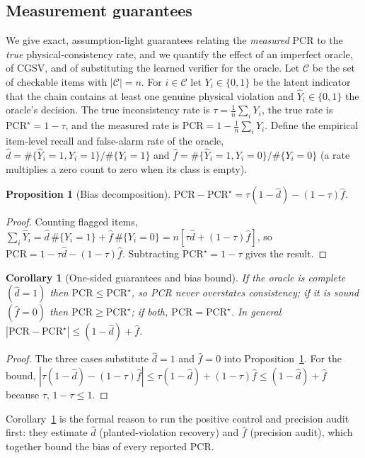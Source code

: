 \documentclass[pdflatex,sn-nature]{sn-jnl}
\newtheorem{proposition}{Proposition}
\newtheorem{corollary}{Corollary}
\begin{document}
\subsection*{Measurement guarantees}
We give exact, assumption-light guarantees relating the \emph{measured} PCR to the
\emph{true} physical-consistency rate, and we quantify the effect of an imperfect
oracle, of CGSV, and of substituting the learned verifier for the oracle. Let
$\mathcal{C}$ be the set of checkable items with $|\mathcal{C}|=n$. For
$i\in\mathcal{C}$ let $Y_i\in\{0,1\}$ be the latent indicator that the chain contains
at least one genuine physical violation and $\hat Y_i\in\{0,1\}$ the oracle's decision.
The true inconsistency rate is $\tau=\frac1n\sum_i Y_i$, the true rate is
$\mathrm{PCR}^\star=1-\tau$, and the measured rate is
$\mathrm{PCR}=1-\frac1n\sum_i\hat Y_i$. Define the empirical item-level recall and
false-alarm rate of the oracle,
$\hat d=\#\{\hat Y_i{=}1,Y_i{=}1\}/\#\{Y_i{=}1\}$ and
$\hat f=\#\{\hat Y_i{=}1,Y_i{=}0\}/\#\{Y_i{=}0\}$ (a rate multiplies a zero
count to zero when its class is empty).

\begin{proposition}[Bias decomposition]\label{prop:bias}
$\mathrm{PCR}-\mathrm{PCR}^\star=\tau(1-\hat d)-(1-\tau)\hat f.$
\end{proposition}
\begin{proof}
Counting flagged items,
$\sum_i\hat Y_i=\hat d\,\#\{Y_i{=}1\}+\hat f\,\#\{Y_i{=}0\}=n[\tau\hat d+(1-\tau)\hat f]$,
so $\mathrm{PCR}=1-\tau\hat d-(1-\tau)\hat f$. Subtracting $\mathrm{PCR}^\star=1-\tau$
gives the result.
\end{proof}

\begin{corollary}[One-sided guarantees and bias bound]\label{cor:onesided}
If the oracle is complete $(\hat d=1)$ then $\mathrm{PCR}\le\mathrm{PCR}^\star$, so PCR
never overstates consistency; if it is sound $(\hat f=0)$ then
$\mathrm{PCR}\ge\mathrm{PCR}^\star$; if both, $\mathrm{PCR}=\mathrm{PCR}^\star$. In
general $|\mathrm{PCR}-\mathrm{PCR}^\star|\le(1-\hat d)+\hat f$.
\end{corollary}
\begin{proof}
The three cases substitute $\hat d=1$ and $\hat f=0$ into
Proposition~\ref{prop:bias}. For the bound,
$|\tau(1-\hat d)-(1-\tau)\hat f|\le\tau(1-\hat d)+(1-\tau)\hat f\le(1-\hat d)+\hat f$
because $\tau,\,1-\tau\le1$.
\end{proof}

\noindent Corollary~\ref{cor:onesided} is the formal reason to run the positive control
and precision audit first: they estimate $\hat d$ (planted-violation recovery) and
$\hat f$ (precision audit), which together bound the bias of every reported PCR.
\end{document}
